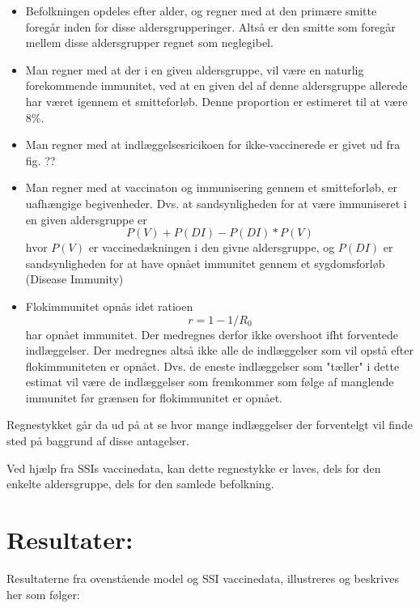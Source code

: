 \documentclass{article}
\begin{document}
\begin{itemize}
\item Befolkningen opdeles efter alder, og regner med at den primære smitte foregår inden for disse aldersgrupperinger. 
Altså er den smitte som foregår mellem disse aldersgrupper regnet som neglegibel. 

\item Man regner med at der i en given aldersgruppe, vil være en naturlig forekommende immunitet, ved at en given del af denne aldersgruppe allerede har været igennem et smitteforløb. 
Denne proportion er estimeret til at være 8\%.

\item Man regner med at indlæggelsesricikoen for ikke-vaccinerede er givet ud fra fig. ?? 

\item Man regner med at vaccinaton og immunisering gennem et smitteforløb, er uafhængige begivenheder. 
Dvs. at sandsynligheden for at være immuniseret i en given aldersgruppe er 
$$P(V) + P(DI) - P(DI)*P(V)$$
hvor $P(V)$ er vaccinedækningen i den givne aldersgruppe, og $P(DI)$ er sandsynligheden for at have opnået immunitet gennem et sygdomsforløb (Disease Immunity)

\item Flokimmunitet opnås idet ratioen 
$$r = 1 - 1/R_{0}$$ 
har opnået immunitet. 
Der medregnes derfor ikke overshoot ifht forventede indlæggelser.
Der medregnes altså ikke alle de indlæggelser som vil opstå efter flokimmuniteten er opnået. 
Dvs. de eneste indlæggelser som "tæller" i dette estimat vil være de indlæggelser som fremkommer som følge af manglende immunitet før grænsen for flokimmunitet er opnået.
\end{itemize}

Regnestykket går da ud på at se hvor mange indlæggelser der forventelgt vil finde sted på baggrund af disse antagelser.

Ved hjælp fra SSIs vaccinedata, kan dette regnestykke er laves, dels for den enkelte aldersgruppe, dels for den samlede befolkning.

\section*{Resultater:}
Resultaterne fra ovenstående model og SSI vaccinedata, illustreres og beskrives her som følger:




\printbibliography
\end{document}
